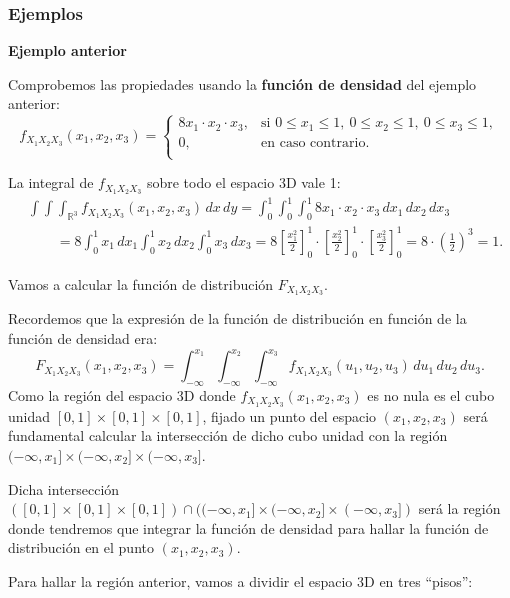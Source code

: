 \documentclass[]{book}
\begin{document}
\hypertarget{ejemplos-18}{%
\subsubsection{Ejemplos}\label{ejemplos-18}}

\textbf{Ejemplo anterior}

Comprobemos las propiedades usando la \textbf{función de densidad} del ejemplo anterior:
\[
f_{X_1X_2X_3}(x_1,x_2,x_3)=\begin{cases}
8 x_1\cdot x_2\cdot x_3, & \mbox{si }0\leq x_1\leq 1,\ 0\leq x_2\leq 1,\ 0\leq x_3\leq 1, \\
0, & \mbox{en caso contrario.}\\
\end{cases}
\]

La integral de \(f_{X_1X_2X_3}\) sobre todo el espacio 3D vale 1:
\[
\begin{array}{rl}
& \int\int\int_{\mathbb{R}^3} f_{X_1X_2X_3}(x_1,x_2,x_3)\,dx\, dy=\int_0^1\int_0^1\int_0^1 8 x_1\cdot x_2\cdot x_3\, dx_1\,dx_2\,dx_3\\ & \qquad=8\int_0^1 x_1\, dx_1\int_0^1 x_2\, dx_2\int_0^1 x_3\,dx_3=8\left[\frac{x_1^2}{2}\right]_0^1\cdot\left[\frac{x_2^2}{2}\right]_0^1\cdot \left[\frac{x_3^2}{2}\right]_0^1=8\cdot\left(\frac{1}{2}\right)^3 =1.
\end{array}
\]

Vamos a calcular la función de distribución \(F_{X_1X_2X_3}\).

Recordemos que la expresión de la función de distribución en función de la función de densidad era:
\[
F_{X_1X_2X_3}(x_1,x_2,x_3)=\int_{-\infty}^{x_1}\int_{-\infty}^{x_2}\int_{-\infty}^{x_3}f_{X_1X_2X_3}(u_1,u_2,u_3)\,du_1\, du_2\, du_3.
\]
Como la región del espacio 3D donde \(f_{X_1X_2X_3}(x_1,x_2,x_3)\) es no nula es el cubo unidad \([0,1]\times [0,1]\times [0,1]\), fijado un punto del espacio \((x_1,x_2,x_3)\) será fundamental calcular la intersección de dicho cubo unidad con la región \((-\infty,x_1]\times (-\infty,x_2]\times (-\infty,x_3]\).

Dicha intersección \(([0,1]\times [0,1]\times [0,1])\cap ((-\infty,x_1]\times (-\infty,x_2]\times (-\infty,x_3])\) será la región donde tendremos que integrar la función de densidad para hallar la función de distribución en el punto \((x_1,x_2,x_3)\).

Para hallar la región anterior, vamos a dividir el espacio 3D en tres ``pisos'':
\end{document}
